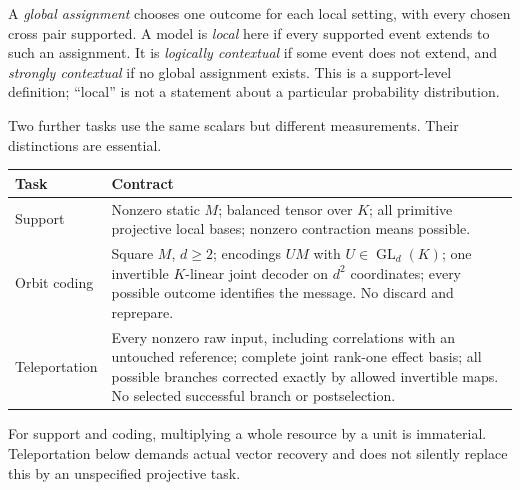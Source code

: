 \documentclass[11pt]{article}
\theoremstyle{definition}\newtheorem{definition}[theorem]{Definition}
\theoremstyle{remark}\newtheorem{remark}[theorem]{Remark}
\DeclareMathOperator{\GL}{GL}
\begin{document}
A \emph{global assignment} chooses one outcome for each local setting, with every chosen cross pair supported. A model is \emph{local} here if every supported event extends to such an assignment. It is \emph{logically contextual} if some event does not extend, and \emph{strongly contextual} if no global assignment exists. This is a support-level definition; ``local'' is not a statement about a particular probability distribution.

Two further tasks use the same scalars but different measurements. Their distinctions are essential.
\begin{center}\small
\begin{tabular}{p{.15\linewidth}p{.74\linewidth}}
\toprule
Task & Contract \\\midrule
Support & Nonzero static $M$; balanced tensor over $K$; all primitive projective local bases; nonzero contraction means possible. \\
Orbit coding & Square $M$, $d\geq2$; encodings $UM$ with $U\in\GL_d(K)$; one invertible $K$-linear joint decoder on $d^2$ coordinates; every possible outcome identifies the message. No discard and reprepare. \\
Teleportation & Every nonzero raw input, including correlations with an untouched reference; complete joint rank-one effect basis; all possible branches corrected exactly by allowed invertible maps. No selected successful branch or postselection. \\\bottomrule
\end{tabular}
\end{center}
For support and coding, multiplying a whole resource by a unit is immaterial. Teleportation below demands actual vector recovery and does not silently replace this by an unspecified projective task.
\end{document}

